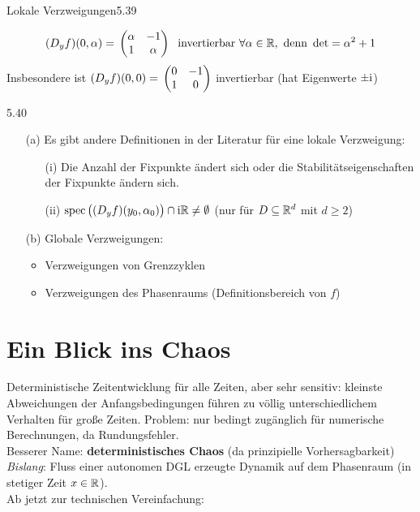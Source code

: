 \documentclass[a4paper]{article}
\begin{document}
\begin{Beispiel}{Lokale Verzweigungen}{5.39}
\begin{itemize}
\begin{center}
\end{center}

\[(D_yf)(0,\alpha)=\mathop{}\begin{pmatrix}\alpha&-1\\1&\alpha\end{pmatrix}\;\text{ invertierbar }\forall\alpha\in\mathbb R,\text{ denn }\det=\alpha^2+1\]
Insbesondere ist $(D_yf)(0,0)=\mathop{}\begin{pmatrix}0&-1\\1&0\end{pmatrix}$ invertierbar (hat Eigenwerte $\pm\mathrm{i}$)
\end{itemize}

\end{Beispiel}

\begin{Bemerkung}{}{5.40}
\begin{itemize}
\item[(a)] Es gibt andere Definitionen in der Literatur für eine lokale Verzweigung:
\begin{itemize}
\item[(i)] Die Anzahl der Fixpunkte ändert sich oder die Stabilitätseigenschaften der Fixpunkte ändern sich.
\item[(ii)] $\operatorname{\mathrm{spec}}\big((D_yf)(y_0,\alpha_0)\big)\cap\mathrm{i}\mathbb R\ne\emptyset$ (nur für $D\subseteq \mathbb R^d$ mit $d\ge2$)
\end{itemize}
\item[(b)] Globale Verzweigungen:
\begin{itemize}
\item Verzweigungen von Grenzzyklen
\item Verzweigungen des Phasenraums (Definitionsbereich von $f$)
\end{itemize}
\end{itemize}
\end{Bemerkung}

\section{Ein Blick ins Chaos}
Deterministische Zeitentwicklung für alle Zeiten, aber sehr sensitiv: kleinste Abweichungen der Anfangsbedingungen führen zu völlig unterschiedlichem Verhalten für große Zeiten. Problem: nur bedingt zugänglich für numerische Berechnungen, da Rundungsfehler.\\
Besserer Name: \textbf{deterministisches Chaos} (da prinzipielle Vorhersagbarkeit)\\
\textit{Bislang}: Fluss einer autonomen DGL erzeugte Dynamik auf dem Phasenraum (in \glqq stetiger\grqq{} Zeit $x\in\mathbb R$).\\
Ab jetzt zur technischen Vereinfachung:
\end{document}

